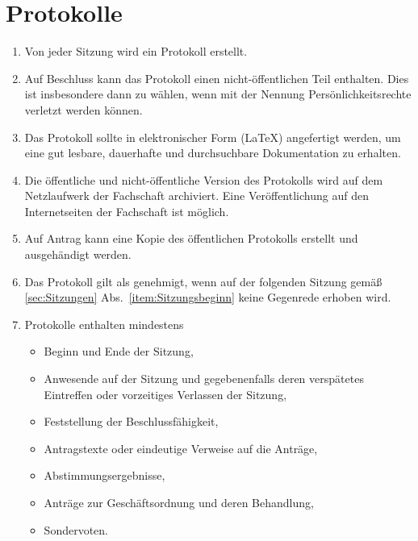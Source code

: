 \section{Protokolle}
\label{sec:protokolle}
\begin{enumerate}
	\item Von jeder Sitzung wird ein Protokoll erstellt.
	\item Auf Beschluss kann das Protokoll einen nicht-öffentlichen Teil enthalten.
	Dies ist insbesondere dann zu wählen, wenn mit der Nennung Persönlichkeitsrechte verletzt werden können.
	\item Das Protokoll sollte in elektronischer Form (\LaTeX) angefertigt werden, um eine gut lesbare, dauerhafte und durchsuchbare Dokumentation zu erhalten.
	\item Die öffentliche und nicht-öffentliche Version des Protokolls wird auf dem Netzlaufwerk der Fachschaft archiviert.
	Eine Veröffentlichung auf den Internetseiten der Fachschaft ist möglich.
	\item Auf Antrag kann eine Kopie des öffentlichen Protokolls erstellt und ausgehändigt werden.
	\item Das Protokoll gilt als genehmigt, wenn auf der folgenden Sitzung gemäß \ref{sec:Sitzungen} Abs.~\ref{item:Sitzungsbeginn} keine Gegenrede erhoben wird.
	\item Protokolle enthalten mindestens
	\begin{itemize}
		\item Beginn und Ende der Sitzung,
		\item Anwesende auf der Sitzung und gegebenenfalls deren verspätetes Eintreffen oder vorzeitiges Verlassen der Sitzung,
		\item Feststellung der Beschlussfähigkeit,
		\item Antragstexte oder eindeutige Verweise auf die Anträge,
		\item Abstimmungsergebnisse,
		\item Anträge zur Geschäftsordnung und deren Behandlung,
		\item Sondervoten.
	\end{itemize}
\end{enumerate}


